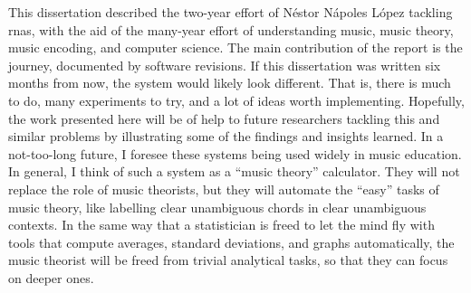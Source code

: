 
This dissertation described the two-year effort of N\'estor
N\'apoles L\'opez tackling \glspl{rna}, with the aid of the
many-year effort of understanding music, music theory, music
encoding, and computer science. The main contribution of the
report is the journey, documented by software revisions. If
this dissertation was written six months from now, the
system would likely look different. That is, there is much
to do, many experiments to try, and a lot of ideas worth
implementing. Hopefully, the work presented here will be of
help to future researchers tackling this and similar
problems by illustrating some of the findings and insights
learned. In a not-too-long future, I foresee these systems
being used widely in music education. In general, I think of
such a system as a ``music theory'' calculator. They will
not replace the role of music theorists, but they will
automate the ``easy'' tasks of music theory, like labelling
clear unambiguous chords in clear unambiguous contexts. In
the same way that a statistician is freed to let the mind
fly with tools that compute averages, standard deviations,
and graphs automatically, the music theorist will be freed
from trivial analytical tasks, so that they can focus on
deeper ones. 
